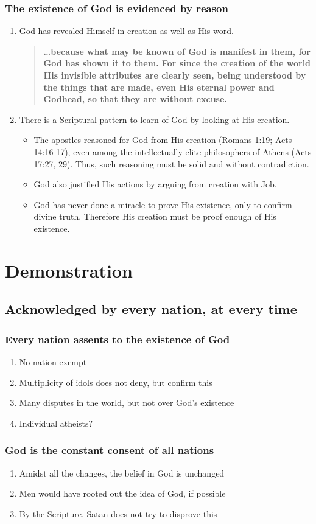 \documentclass{book}
\newcommand{\BE}{\begin{enumerate}\item}
\newcommand{\EE}{\end{enumerate}}
\newcommand{\BI}{\begin{itemize}\item}
\newcommand{\EI}{\end{itemize}}
\newcommand{\I}{\item}
\newcommand{\Q}[2]{\begin{quote} \textbf{#2 \center{#1}}\end{quote}}
\begin{document}
\subsection{The existence of God is evidenced by reason}
\BE God has revealed Himself in creation as well as His word.
    \Q{Romans 1:19-20}
    {\ldots because what may be known of God is manifest in them, 
    for God has shown it to them. 
    For since the creation of the world His invisible attributes are
    clearly seen, being understood by the things that are made, 
    even His eternal power and Godhead, 
    so that they are without excuse.}
\I  There is a Scriptural pattern to learn of God by looking at
    His creation.
    \BI The apostles reasoned for God from His creation
        (Romans 1:19; Acts 14:16-17),
        even among the intellectually elite
        philosophers of Athens (Acts 17:27, 29).  
        Thus, such reasoning must be solid and without contradiction.
    \I  God also justified His actions by arguing from creation
        with Job.
    \I  God has never done a miracle to prove His existence,
        only to confirm divine truth.
        Therefore His creation must be proof enough of 
        His existence. \EI 
\EE


\chapter{Demonstration}
\section{Acknowledged by every nation, at every time}
\subsection{Every nation assents to the existence of God}
\BE No nation exempt
\I  Multiplicity of idols does not deny, but confirm this
\I  Many disputes in the world, but not over God's existence
\I  Individual atheists? \EE
\subsection{God is the constant consent of all nations}
\BE Amidst all the changes, the belief in God is unchanged
\I  Men would have rooted out the idea of God, if possible
\I  By the Scripture, Satan does not try to disprove this \EE
\end{document}
